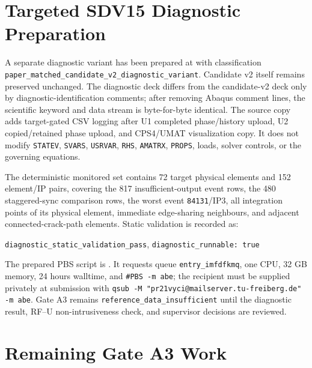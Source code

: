 \documentclass[11pt,a4paper]{article}
\begin{document}
\section{Targeted SDV15 Diagnostic Preparation}

A separate diagnostic variant has been prepared at  with classification \texttt{paper\_matched\_candidate\_v2\_diagnostic\_variant}. Candidate v2 itself remains preserved unchanged. The diagnostic deck differs from the candidate-v2 deck only by diagnostic-identification comments; after removing Abaqus comment lines, the scientific keyword and data stream is byte-for-byte identical. The source copy adds target-gated CSV logging after U1 completed phase/history upload, U2 copied/retained phase upload, and CPS4/UMAT visualization copy. It does not modify \texttt{STATEV}, \texttt{SVARS}, \texttt{USRVAR}, \texttt{RHS}, \texttt{AMATRX}, \texttt{PROPS}, loads, solver controls, or the governing equations.

The deterministic monitored set contains 72 target physical elements and 152 element/IP pairs, covering the 817 insufficient-output event rows, the 480 staggered-sync comparison rows, the worst event \texttt{84131}/IP3, all integration points of its physical element, immediate edge-sharing neighbours, and adjacent connected-crack-path elements. Static validation is recorded as:

\begin{center}
\texttt{diagnostic\_static\_validation\_pass}, \texttt{diagnostic\_runnable: true}
\end{center}

The prepared PBS script is . It requests queue \texttt{entry\_imfdfkmq}, one CPU, 32 GB memory, 24 hours walltime, and \texttt{\#PBS -m abe}; the recipient must be supplied privately at submission with \texttt{qsub -M "pr21vyci@mailserver.tu-freiberg.de" -m abe}. Gate A3 remains \texttt{reference\_data\_insufficient} until the diagnostic result, RF--U non-intrusiveness check, and supervisor decisions are reviewed.

\section{Remaining Gate A3 Work}
\end{document}
